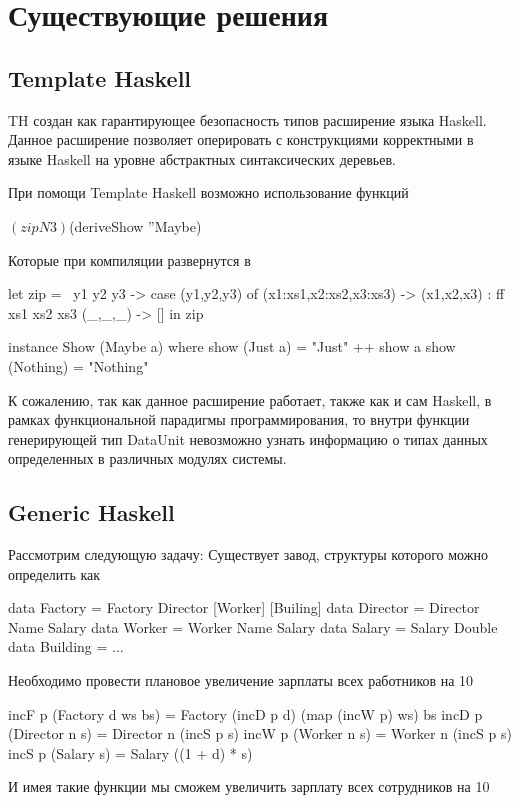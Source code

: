 \chapter{Существующие решения}

\section{Template Haskell}

TH создан как гарантирующее безопасность типов расширение языка
Haskell. Данное расширение позволяет оперировать с конструкциями
корректными в языке Haskell на уровне абстрактных синтаксических
деревьев.

При помощи Template Haskell возможно использование функций
\begin{code}
$(zipN 3)
$(deriveShow ''Maybe)
\end{code}
Которые при компиляции развернутся в
\begin{code}
let zip = \ y1 y2 y3 ->
  case (y1,y2,y3) of
    (x1:xs1,x2:xs2,x3:xs3) -> (x1,x2,x3) : ff xs1 xs2 xs3
    (_,_,_) -> []
in zip

instance Show (Maybe a) where
  show (Just a) = "Just" ++ show a
  show (Nothing) = "Nothing"
\end{code}

К сожалению, так как данное расширение работает, также как и сам
Haskell, в рамках функциональной парадигмы программирования, то внутри
функции генерирующей тип DataUnit невозможно узнать информацию о типах
данных определенных в различных модулях системы.

\section{Generic Haskell}

Рассмотрим следующую задачу: Существует завод, структуры которого
можно определить как
\begin{code}
  data Factory  = Factory Director [Worker] [Builing]
  data Director = Director Name Salary
  data Worker   = Worker Name Salary
  data Salary   = Salary Double
  data Building = ...
\end{code}
Необходимо провести плановое увеличение зарплаты всех работников на
10%

\begin{code}
  incF p (Factory d ws bs) = Factory (incD p d) (map (incW p) ws) bs
  incD p (Director n s) = Director n (incS p s)
  incW p (Worker n s)   = Worker n (incS p s)
  incS p (Salary s)     = Salary ((1 + d) * s)
\end{code}
И имея такие функции мы сможем увеличить зарплату всех сотрудников на
10%

